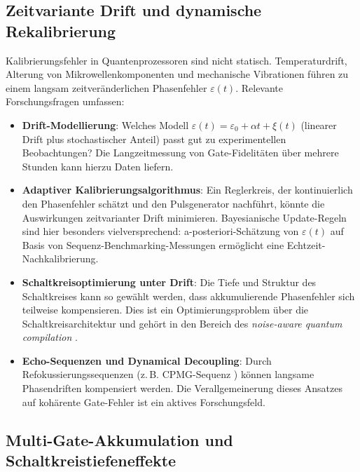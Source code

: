 ﻿\documentclass[11pt,a4paper]{article}
\theoremstyle{definition}
\newcommand{\eps}{\varepsilon}
\begin{document}
\subsection{Zeitvariante Drift und dynamische Rekalibrierung}
\label{subsec:drift}

Kalibrierungsfehler in Quantenprozessoren sind nicht statisch.
Temperaturdrift, Alterung von Mikrowellenkomponenten und mechanische
Vibrationen führen zu einem langsam zeitveränderlichen Phasenfehler
$\eps(t)$.  Relevante Forschungsfragen umfassen:

\begin{itemize}
  \item \textbf{Drift-Modellierung}: Welches Modell $\eps(t) = \eps_0 + \alpha t + \xi(t)$
        (linearer Drift plus stochastischer Anteil) passt gut zu experimentellen
        Beobachtungen?  Die Langzeitmessung von Gate-Fidelitäten über mehrere
        Stunden kann hierzu Daten liefern.

  \item \textbf{Adaptiver Kalibrierungsalgorithmus}: Ein Reglerkreis, der
        kontinuierlich den Phasenfehler schätzt und den Pulsgenerator
        nachführt, könnte die Auswirkungen zeitvarianter Drift minimieren.
        Bayesianische Update-Regeln sind hier besonders vielversprechend:
        a-posteriori-Schätzung von $\eps(t)$ auf Basis von
        Sequenz-Benchmarking-Messungen \cite{Magesan2011} ermöglicht eine
        Echtzeit-Nachkalibrierung.

  \item \textbf{Schaltkreisoptimierung unter Drift}: Die Tiefe und
        Struktur des Schaltkreises kann so gewählt werden, dass akkumulierende
        Phasenfehler sich teilweise kompensieren.  Dies ist ein
        Optimierungsproblem über die Schaltkreisarchitektur und gehört
        in den Bereich des \emph{noise-aware quantum compilation} \cite{Murali2019}.

  \item \textbf{Echo-Sequenzen und Dynamical Decoupling}: Durch
        Refokussierungssequenzen (z.\,B. CPMG-Sequenz \cite{Carr1954}) können
        langsame Phasendriften kompensiert werden.  Die Verallgemeinerung
        dieses Ansatzes auf kohärente Gate-Fehler ist ein aktives Forschungsfeld.
\end{itemize}

\subsection{Multi-Gate-Akkumulation und Schaltkreistiefeneffekte}
\label{subsec:accumulation}
\end{document}
